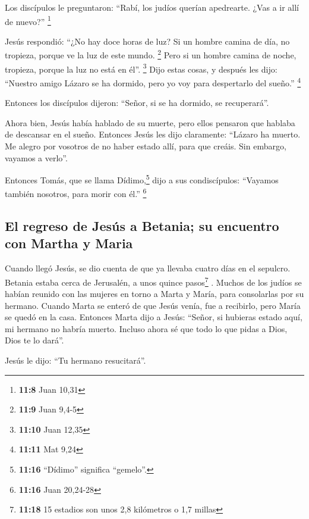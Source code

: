 \begin{paracol}{2}
 Los discípulos le preguntaron: ``Rabí, los judíos querían
apedrearte. ¿Vas a ir allí de nuevo?'' \footnote{\textbf{11:8} Juan
  10,31}

 Jesús respondió: ``¿No hay doce horas de luz? Si un
hombre camina de día, no tropieza, porque ve la luz de este mundo.
\footnote{\textbf{11:9} Juan 9,4-5}  Pero si un hombre
camina de noche, tropieza, porque la luz no está en él''. \footnote{\textbf{11:10}
  Juan 12,35}  Dijo estas cosas, y después les dijo:
``Nuestro amigo Lázaro se ha dormido, pero yo voy para despertarlo del
sueño.'' \footnote{\textbf{11:11} Mat 9,24}

 Entonces los discípulos dijeron: ``Señor, si se ha
dormido, se recuperará''.

 Ahora bien, Jesús había hablado de su muerte, pero ellos
pensaron que hablaba de descansar en el sueño.  Entonces
Jesús les dijo claramente: ``Lázaro ha muerto.  Me alegro
por vosotros de no haber estado allí, para que creáis. Sin embargo,
vayamos a verlo''.

 Entonces Tomás, que se llama Dídimo,\footnote{\textbf{11:16}
  ``Dídimo'' significa ``gemelo''.} dijo a sus condiscípulos: ``Vayamos
también nosotros, para morir con él.'' \footnote{\textbf{11:16} Juan
  20,24-28}

\hypertarget{el-regreso-de-jesuxfas-a-betania-su-encuentro-con-martha-y-maria}{%
\subsection{El regreso de Jesús a Betania; su encuentro con Martha y
Maria}\label{el-regreso-de-jesuxfas-a-betania-su-encuentro-con-martha-y-maria}}

 Cuando llegó Jesús, se dio cuenta de que ya llevaba
cuatro días en el sepulcro.  Betania estaba cerca de
Jerusalén, a unos quince pasos\footnote{\textbf{11:18} 15 estadios son
  unos 2,8 kilómetros o 1,7 millas} .  Muchos de los
judíos se habían reunido con las mujeres en torno a Marta y María, para
consolarlas por su hermano.  Cuando Marta se enteró de
que Jesús venía, fue a recibirlo, pero María se quedó en la casa.
 Entonces Marta dijo a Jesús: ``Señor, si hubieras estado
aquí, mi hermano no habría muerto.  Incluso ahora sé que
todo lo que pidas a Dios, Dios te lo dará''.

 Jesús le dijo: ``Tu hermano resucitará''.


\end{paracol}
